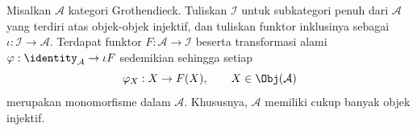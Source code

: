 \begin{teorema}[A.\ Grothendieck]\label{prop:Grothendieck-injective}
Misalkan $\mathcal{A}$ kategori Grothendieck. Tuliskan $\mathcal{I}$ untuk
subkategori penuh dari $\mathcal{A}$ yang terdiri atas objek-objek injektif,
dan tuliskan funktor inklusinya sebagai $\iota:\mathcal{I}\to\mathcal{A}$.
Terdapat funktor $F:\mathcal{A}\to\mathcal{I}$ beserta transformasi alami
$\varphi:\identity_{\mathcal{A}}\to\iota F$ sedemikian sehingga setiap
\[\varphi_X:X\to F(X),\qquad X\in\Obj(\mathcal{A})\]
merupakan monomorfisme dalam $\mathcal{A}$. Khususnya, $\mathcal{A}$ memiliki
cukup banyak objek injektif.
\end{teorema}

